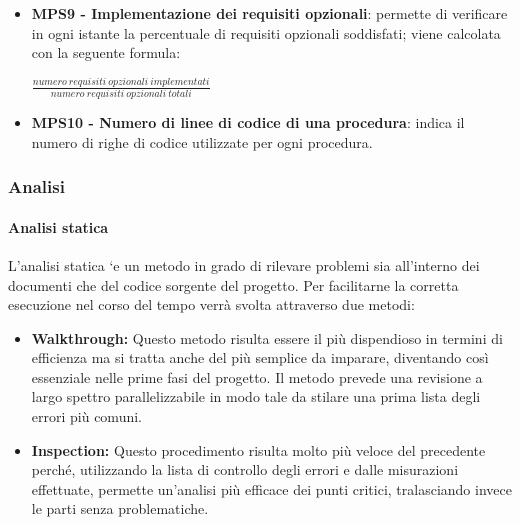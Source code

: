 \documentclass[11pt,a4paper]{article}
\begin{document}
{\begin{itemize}
	 
	 \item \textbf{MPS9 - Implementazione dei requisiti opzionali}: permette di verificare in ogni istante la percentuale di requisiti opzionali soddisfati; viene calcolata con la seguente formula: 
		\begin{center}
		$\frac{numero\ requisiti\ opzionali\ implementati}{numero\ requisiti\ opzionali\ totali}$
	\end{center}

	  \item \textbf{MPS10 - Numero di linee di codice di una procedura}: indica il numero di righe di codice utilizzate per ogni procedura.

	\end{itemize}
	
	\subsubsection{Analisi}
	\paragraph{Analisi statica\\}
	L'analisi statica `e un metodo in grado di rilevare problemi sia all'interno dei documenti che del codice sorgente del progetto. Per facilitarne la corretta esecuzione nel corso del tempo verrà svolta attraverso due metodi:
\begin{itemize}
	\item\textbf{Walkthrough:} Questo metodo risulta essere il più dispendioso in termini di efficienza ma si tratta anche del più semplice da imparare, diventando così essenziale nelle prime fasi del progetto. Il  metodo  prevede  una  revisione  a  largo  spettro  parallelizzabile  in  modo  tale  da stilare una prima lista degli errori più comuni.
	\item \textbf{Inspection:} Questo procedimento risulta molto più veloce del precedente perché, utilizzando la lista di controllo degli errori e dalle misurazioni effettuate, permette un'analisi più efficace dei punti critici, tralasciando invece le parti senza problematiche.
	\end{itemize}
	
}
\end{document}
